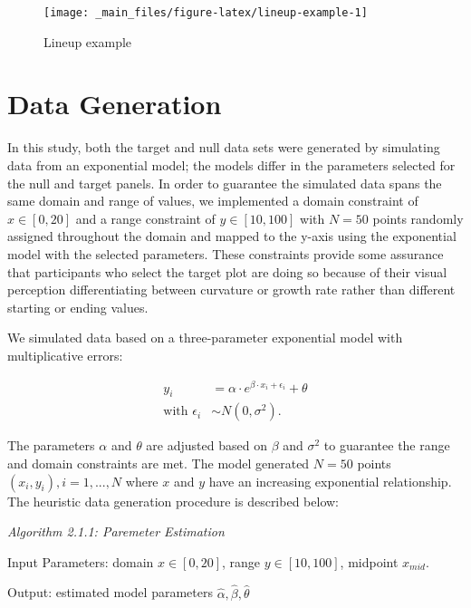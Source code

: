 \documentclass[print]{nuthesis}
\begin{document}
\begin{figure}

{\centering \texttt{[image: \_main\_files/figure-latex/lineup-example-1]} 

}

\caption{Lineup example}\label{fig:lineup-example}
\end{figure}

\hypertarget{data-generation}{%
\section{Data Generation}\label{data-generation}}

In this study, both the target and null data sets were generated by simulating data from an exponential model; the models differ in the parameters selected for the null and target panels.
In order to guarantee the simulated data spans the same domain and range of values, we implemented a domain constraint of \(x\in [0,20]\) and a range constraint of \(y\in [10,100]\) with \(N = 50\) points randomly assigned throughout the domain and mapped to the y-axis using the exponential model with the selected parameters.
These constraints provide some assurance that participants who select the target plot are doing so because of their visual perception differentiating between curvature or growth rate rather than different starting or ending values.

We simulated data based on a three-parameter exponential model with multiplicative errors:

\begin{align}
y_i & = \alpha\cdot e^{\beta\cdot x_i + \epsilon_i} + \theta \\
\text{with } \epsilon_i & \sim N(0, \sigma^2). \nonumber
\end{align}

\noindent The parameters \(\alpha\) and \(\theta\) are adjusted based on \(\beta\) and \(\sigma^2\) to guarantee the range and domain constraints are met.
The model generated \(N = 50\) points \((x_i, y_i), i = 1,...,N\) where \(x\) and \(y\) have an increasing exponential relationship.
The heuristic data generation procedure is described below:

\textit{Algorithm 2.1.1: Paremeter Estimation}

Input Parameters: domain \(x\in[0,20]\), range \(y\in[10,100]\), midpoint \(x_{mid}\).

Output: estimated model parameters \(\hat\alpha, \hat\beta, \hat\theta\)
\end{document}
